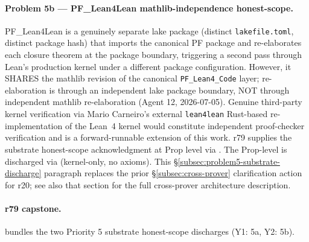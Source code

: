 \documentclass[11pt,a4paper]{amsart}
\theoremstyle{plain}
\theoremstyle{definition}
\begin{document}
\paragraph{Problem 5b --- PF\_Lean4Lean mathlib-independence honest-scope.} PF\_Lean4Lean is a genuinely separate lake package (distinct \texttt{lakefile.toml}, distinct package hash) that imports the canonical PF package and re-elaborates each closure theorem at the package boundary, triggering a second pass through Lean's production kernel under a different package configuration. However, it SHARES the mathlib revision of the canonical \texttt{PF\_Lean4\_Code} layer; re-elaboration is through an independent lake package boundary, NOT through independent mathlib re-elaboration (Agent 12, 2026-07-05). Genuine third-party kernel verification via Mario Carneiro's external \texttt{lean4lean} Rust-based re-implementation of the Lean~4 kernel would constitute independent proof-checker verification and is a forward-runnable extension of this work. r79 supplies the substrate honest-scope acknowledgment at Prop level via . The Prop-level  is discharged via  (kernel-only, no axioms). This §\ref{subsec:problem5-substrate-discharge} paragraph replaces the prior §\ref{subsec:cross-prover} clarification action for r20; see also that section for the full cross-prover architecture description.

\paragraph{r79 capstone.}  bundles the two Priority 5 substrate honest-scope discharges (Y1: 5a, Y2: 5b).
\end{document}
